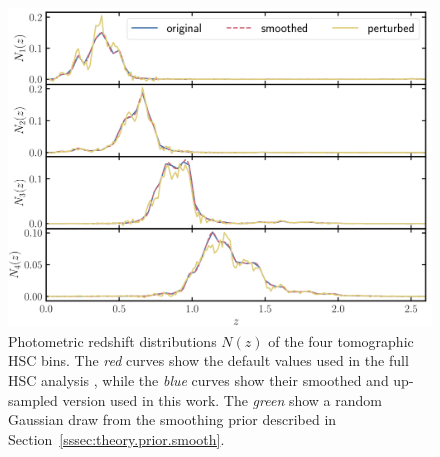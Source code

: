 \documentclass[a4paper,11pt]{article}
\begin{document}
      \begin{figure}[ht]
        \centering
        \includegraphics[width=1.\textwidth]{./Nzs}
        \caption{Photometric redshift distributions $N(z)$ of the four tomographic HSC bins. The \textit{red} curves show the default values used in the full HSC analysis \cite{1912.08209}, while the \textit{blue} curves show their smoothed and up-sampled version used in this work. The \textit{green} show a random Gaussian draw from the smoothing prior described in Section~\ref{sssec:theory.prior.smooth}.}\label{fig:Nzs}
      \end{figure}
\end{document}
